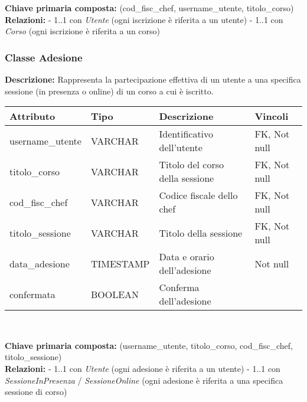 \documentclass[a4paper, 12pt]{article}
\begin{document}
        \noindent\textbf{Chiave primaria composta:} (cod\_fisc\_chef, username\_utente, titolo\_corso)\\[0.1em]
        
        \noindent\textbf{Relazioni:}  
        - 1..1 con \textit{Utente} (ogni iscrizione è riferita a un utente)  
        - 1..1 con \textit{Corso} (ogni iscrizione è riferita a un corso)

    \newpage

    \subsubsection*{Classe Adesione}
        \textbf{Descrizione:} Rappresenta la partecipazione effettiva di un utente a una specifica sessione (in presenza o online) di un corso a cui è iscritto.
        
        {
        \vspace{1em}
        \renewcommand{\arraystretch}{1.3}
        \begin{tabularx}{\textwidth}{|l|l|X|l|}
        \hline
        \textbf{Attributo} & \textbf{Tipo} & \textbf{Descrizione} & \textbf{Vincoli} \\
        \hline
        username\_utente & VARCHAR  & Identificativo dell'utente & FK, Not null \\
        titolo\_corso   & VARCHAR  & Titolo del corso della sessione & FK, Not null \\
        cod\_fisc\_chef & VARCHAR  & Codice fiscale dello chef & FK, Not null \\
        titolo\_sessione & VARCHAR  & Titolo della sessione & FK, Not null \\
        data\_adesione   & TIMESTAMP     & Data e orario dell'adesione & Not null \\
        confermata       & BOOLEAN      & Conferma dell'adesione & \\
        \hline
        \end{tabularx}\\[0.5em]
        }
        
        \noindent\textbf{Chiave primaria composta:} (username\_utente, titolo\_corso, cod\_fisc\_chef, titolo\_sessione)\\[0.2em]
        
        \noindent\textbf{Relazioni:}  
        - 1..1 con \textit{Utente} (ogni adesione è riferita a un utente)  
        - 1..1 con \textit{SessioneInPresenza} / \textit{SessioneOnline} (ogni adesione è riferita a una specifica sessione di corso)
\end{document}
